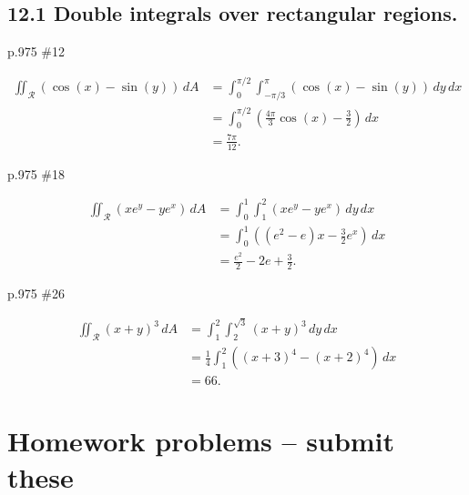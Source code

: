 \subsection{12.1 Double integrals over rectangular regions.}
\begin{practice}p.975 \#12\end{practice}
\begin{pracsol}
  \[\begin{split}
    \iint_{\mathcal R}(\cos(x)-\sin(y))\,dA &= \int_0^{\pi/2}\int_{-\pi/3}^\pi(\cos(x)-\sin(y))\,dy\,dx\\
    &= \int_0^{\pi/2}\left( \frac{4\pi}3\cos(x)-\frac32 \right)\,dx\\
    &= \frac{7\pi}{12}.
  \end{split}\]
\end{pracsol}
\begin{practice}p.975 \#18\end{practice}
\begin{pracsol}
  \[\begin{split}
    \iint_\mathcal R(xe^y-ye^x)\,dA &= \int_0^1\int_1^2(xe^y-ye^x)\,dy\,dx\\
     &= \int_0^1\left((e^2-e)x-\frac32e^x\right)\,dx\\
     &= \frac{e^2}2-2e+\frac32.
  \end{split}\]
\end{pracsol}
\begin{practice}p.975 \#26\end{practice}
\begin{pracsol}
  \[\begin{split}
    \iint_\mathcal R(x+y)^3\,dA &= \int_1^2\int_2^{\sqrt3}(x+y)^3\,dy\,dx\\
    &= \frac14\int_1^2((x+3)^4-(x+2)^4)\,dx \\
    &= 66.
  \end{split}\]
\end{pracsol}

\newpage

\section{Homework problems -- submit these}


